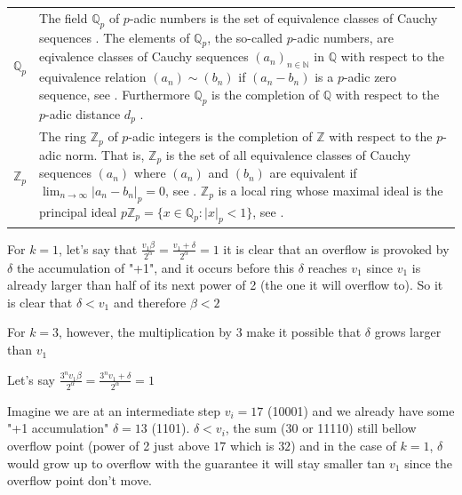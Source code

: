 \documentclass[12pt]{amsart}
\theoremstyle{definition}
\begin{document}
{\begin{table}[H]
\begin{tabular}{|P{1.4cm} p{13.4cm}|}
		$\mathbb{Q}_p$ & The field $\mathbb{Q}_p$ of $p$-adic numbers is the set of equivalence classes of Cauchy sequences \cite[p.~10]{Ref_Koblitz_1984}. The elements of $\mathbb{Q}_p$, the so-called $p$-adic numbers, are eqivalence classes of Cauchy sequences $(a_n)_{n\in\mathbb{N}}$ in $\mathbb{Q}$ with respect to the equivalence relation $(a_n)\sim(b_n)$ if $(a_n-b_n)$ is a $p$-adic zero sequence, see \cite[p.~159]{Ref_Schmidt_2007}. Furthermore $\mathbb{Q}_p$ is the completion of $\mathbb{Q}$ with respect to the $p$-adic distance $d_p$ \cite[p.~159]{Ref_Schmidt_2007}. 
		\\
		$\mathbb{Z}_p$ & The ring $\mathbb{Z}_p$ of $p$-adic integers is the completion of $\mathbb{Z}$ with respect to the $p$-adic norm. That is, $\mathbb{Z}_p$ is the set of all equivalence classes of Cauchy sequences $(a_n)$ where $(a_n)$ and $(b_n)$ are equivalent if $\lim_{n\to\infty}|a_n-b_n|_p=0$, see \cite{Ref_Gupta_2018}. $\mathbb{Z}_p$ is a local ring whose maximal ideal is the principal ideal $p\mathbb{Z}_p=\{x\in\mathbb{Q}_p:|x|_p<1\}$, see \cite[p.~74]{Ref_Gouvea_2020}.
		\\ \hline
	\end{tabular}
\end{table}}


For $k=1$, let's say that $\frac{v_1 \beta}{2^{\alpha}}=\frac{v_1 + \delta}{2^{\alpha}}=1$ it is clear that an overflow is provoked by $\delta$ the accumulation of "+1", and it occurs before this $\delta$ reaches $v_1$ since $v_1$ is already larger than half of its next power of 2 (the one it will overflow to). So it is clear that $\delta<v_1$ and therefore $\beta<2$

For $k=3$, however, the multiplication by 3 make it possible that $\delta$ grows larger than $v_1$

Let's say $\frac{3^nv_1 \beta}{2^{\alpha}}=\frac{3^nv_1 + \delta}{2^{\alpha}}=1$

Imagine we are at an intermediate step $v_i=17$ (10001) and we already have some "+1 accumulation" $\delta=13$ (1101). $\delta<v_i$, the sum (30 or 11110) still bellow overflow point (power of 2 just above $17$ which is $32$) and in the case of $k=1$, $\delta$ would grow up to overflow with the guarantee it will stay smaller tan $v_1$ since the overflow point don't move.
\end{document}
